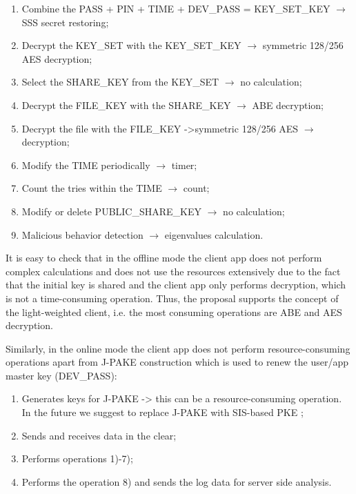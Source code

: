 \documentclass[twocolumn]{svjour3}          	%
\begin{document}
\begin{enumerate}
	\item Combine the PASS + PIN + TIME + DEV\_PASS = KEY\_SET\_KEY $\rightarrow$ SSS secret restoring;
	\item Decrypt the KEY\_SET with the KEY\_SET\_KEY $\rightarrow$ symmetric 128/256 AES decryption;
	\item Select the SHARE\_KEY from the KEY\_SET $\rightarrow$ no calculation;
	\item Decrypt the FILE\_KEY with the SHARE\_KEY $\rightarrow$ ABE decryption;
	\item Decrypt the file with the FILE\_KEY ->symmetric 128/256 AES $\rightarrow$ decryption;
	\item Modify the TIME periodically $\rightarrow$ timer;
	\item Count the tries within the TIME $\rightarrow$ count;
	\item Modify or delete PUBLIC\_SHARE\_KEY $\rightarrow$ no calculation;
	\item Malicious behavior detection $\rightarrow$ eigenvalues calculation.
\end{enumerate}

It is easy to check that in the offline mode the client app does not perform complex calculations and does not use the resources extensively due to the fact that the initial key is shared and the client app only performs decryption, which is not a time-consuming operation. Thus, the proposal supports the concept of the light-weighted client, i.e. the most consuming operations are ABE and AES decryption. 

Similarly, in the online mode the client app does not perform resource-consuming operations apart from J-PAKE construction which is used to renew the user/app master key (DEV\_PASS):

\begin{enumerate}
	\item Generates keys for J-PAKE -> this can be a resource-consuming operation. In the future we suggest to replace J-PAKE with SIS-based PKE \cite{bogos2013primeless,bellovin1992encrypted};
	\item Sends and receives data in the clear;
	\item Performs operations 1)-7);
	\item Performs the operation 8) and sends the log data for server side analysis.
\end{enumerate}
\end{document}

